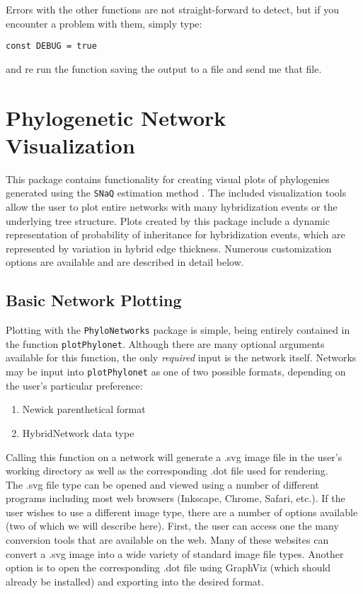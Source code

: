 \documentclass[12pt]{article}
\begin{document}
Errors with the other functions are not straight-forward to detect,
but if you encounter a problem with them, simply type:
\begin{lstlisting}
const DEBUG = true
\end{lstlisting}
and re run the function saving the output to a file and send me that
file.

\section{Phylogenetic Network Visualization}
\label{sectPlot}
This package contains functionality for creating visual plots of
phylogenies generated using the \texttt{SNaQ} estimation method \citep{Solis-Lemus2015}.
The included visualization tools allow the user to plot entire networks with many hybridization events or the underlying tree structure.
Plots created by this package include a dynamic representation of probability of inheritance for hybridization events, which are represented by variation in hybrid edge thickness.
Numerous customization options are available and are described in detail below.

\subsection{Basic Network Plotting}

Plotting with the \texttt{PhyloNetworks} package is simple, being entirely contained in the function \texttt{plotPhylonet}.
Although there are  many optional arguments available for this function, the only \textit{required} input is the network itself.
Networks may be input into \texttt{plotPhylonet} as one of two possible formats, depending on the user's particular preference:
\begin{enumerate}
\item Newick parenthetical format
\item HybridNetwork data type
\end{enumerate}

\noindent Calling this function on a network will generate a .svg image file in the user's working directory
as well as the corresponding .dot file used for rendering. \\

\noindent The .svg file type can be opened and viewed using a number
of different programs including most web browsers (Inkscape, Chrome, Safari, etc.).
If the user wishes to use a different image type, there are a number of options available (two of which we will describe here).
First, the user can access one the many conversion tools that are available on the web. Many of these websites can convert a .svg image into a wide variety of standard image file types.
Another option is to open the corresponding .dot file using GraphViz (which should already be installed) and exporting into the desired format.
\end{document}

